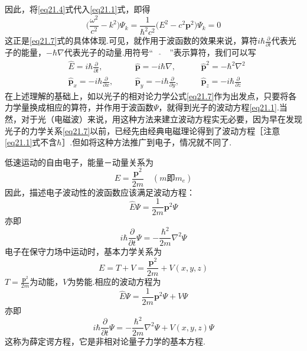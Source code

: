 因此，将\eqref{eq21.4}式代入\eqref{eq21.1}式，即得
\begin{equation*}
	\bigg(\frac{\omega^{2}}{c^{2}}-k^{2} \bigg)\varPsi_{k}=
	\frac{1}{\hbar^{2}c^{2}}\bigg(E^{2}-c^{2}\boldsymbol{p}^{2}\bigg)\varPsi_{k}=0
\end{equation*}
这正是\eqref{eq21.7}式的具体体现.可见，就作用于波函数的效果来说，算符$i\hbar\frac{\partial}{\partial t}$代表光子的能量，$-\hbar\nabla$代表光子的动量.用符号“$\quad\hat{}\quad$”表示算符，我们可以写
\begin{equation}\label{eq21.9}
	\boxed{
	\begin{aligned}
	&\hat{E}=i\hbar \frac{\partial}{\partial t},\quad &&\hat{\boldsymbol{p}}=-i\hbar\nabla,\quad &&\hat{\boldsymbol{p}}^{2}=-\hbar^{2}\nabla^{2}		\\
	&\hat{\boldsymbol{p}}_{x}=-i\hbar\frac{\partial}{\partial x},\quad &&\hat{\boldsymbol{p}}_{y}=-i\hbar\frac{\partial}{\partial y},\quad 
	&&\hat{\boldsymbol{p}}_{z}=-i\hbar\frac{\partial}{\partial z}
	\end{aligned}
	}
\end{equation}\eqshort
在上述理解的基础上，如以光子的相对论力学公式\eqref{eq21.7}作为出发点，只要将各力学量换成相应的算符，并作用于波函数$\varPsi$，就得到光子的波动方程\eqref{eq21.1}.当然，对于光（电磁波）来说，用这种方法来建立波动方程实无必要，因为早在发现光子的力学关系\eqref{eq21.7}以前，已经先由经典电磁理论得到了波动方程［注意\eqref{eq21.1}式不含$\hbar$］.但如将这种方法推广到电子，情况就不同了.

低速运动的自由电子，能量－动量关系为
\begin{equation}\label{eq21.10}
	E=\frac{\boldsymbol{p}^{2}}{2m}\quad(m\text{即}m_{e})
\end{equation}
因此，描述电子波动性的波函数应该满足波动方程：
\begin{equation*}
	\hat{E}\varPsi=\frac{1}{2m}\boldsymbol{p}^{2}\varPsi
\end{equation*}\eqnormal
亦即
\begin{equation}\label{eq21.11}
	i\hbar\frac{\partial}{\partial t}\varPsi=-\frac{\hbar^{2}}{2m}\nabla^{2}\varPsi
\end{equation}
电子在保守力场中运动时，基本力学关系为
\begin{equation}\label{eq21.12}
	E=T+V=\frac{\boldsymbol{p}^{2}}{2m}+V(x,y,z)
\end{equation}
$T=\frac{\boldsymbol{p}^{2}}{2m}$为动能，$V$为势能.相应的波动方程为
\begin{equation}\label{eq21.13}
	\hat{E}\varPsi=\frac{1}{2m}\boldsymbol{p}^{2}\varPsi+V\varPsi
\end{equation}
亦即
\begin{equation}\label{eq21.14}
	i\hbar\frac{\partial}{\partial t}\varPsi=-\frac{\hbar^{2}}{2m}\nabla^{2}\varPsi+V(x,y,z)\varPsi
\end{equation}\eqshort
这称为薛定谔方程，它是非相对论量子力学的基本方程.

